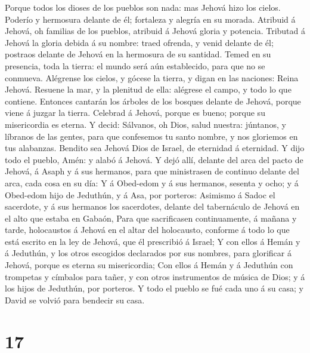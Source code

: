  Porque todos los dioses de los pueblos son nada: mas
Jehová hizo los cielos.  Poderío y hermosura delante de
él; fortaleza y alegría en su morada.  Atribuid á Jehová,
oh familias de los pueblos, atribuid á Jehová gloria y potencia.
 Tributad á Jehová la gloria debida á su nombre: traed
ofrenda, y venid delante de él; postraos delante de Jehová en la
hermosura de su santidad.  Temed en su presencia, toda la
tierra: el mundo será aún establecido, para que no se conmueva.
 Alégrense los cielos, y gócese la tierra, y digan en las
naciones: Reina Jehová.  Resuene la mar, y la plenitud de
ella: alégrese el campo, y todo lo que contiene. 
Entonces cantarán los árboles de los bosques delante de Jehová, porque
viene á juzgar la tierra.  Celebrad á Jehová, porque es
bueno; porque su misericordia es eterna.  Y decid:
Sálvanos, oh Dios, salud nuestra: júntanos, y líbranos de las gentes,
para que confesemos tu santo nombre, y nos gloriemos en tus alabanzas.
 Bendito sea Jehová Dios de Israel, de eternidad á
eternidad. Y dijo todo el pueblo, Amén: y alabó á Jehová.
 Y dejó allí, delante del arca del pacto de Jehová, á
Asaph y á sus hermanos, para que ministrasen de continuo delante del
arca, cada cosa en su día:  Y á Obed-edom y á sus
hermanos, sesenta y ocho; y á Obed-edom hijo de Jeduthún, y á Asa, por
porteros:  Asimismo á Sadoc el sacerdote, y á sus
hermanos los sacerdotes, delante del tabernáculo de Jehová en el alto
que estaba en Gabaón,  Para que sacrificasen
continuamente, á mañana y tarde, holocaustos á Jehová en el altar del
holocausto, conforme á todo lo que está escrito en la ley de Jehová, que
él prescribió á Israel;  Y con ellos á Hemán y á
Jeduthún, y los otros escogidos declarados por sus nombres, para
glorificar á Jehová, porque es eterna su misericordia; 
Con ellos á Hemán y á Jeduthún con trompetas y címbalos para tañer, y
con otros instrumentos de música de Dios; y á los hijos de Jeduthún, por
porteros.  Y todo el pueblo se fué cada uno á su casa; y
David se volvió para bendecir su casa.

\hypertarget{section-16}{%
\section{17}\label{section-16}}

